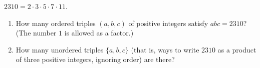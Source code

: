 $2310=2\cdot3\cdot5\cdot7\cdot11$.
\begin{enumerate}
\item[(a)] How many ordered triples $(a,b,c)$ of positive integers satisfy $abc=2310$? (The number $1$ is allowed as a factor.)
\item[(b)] How many unordered triples $\{a,b,c\}$ (that is, ways to write $2310$ as a product of three positive integers, ignoring order) are there?
\end{enumerate}
